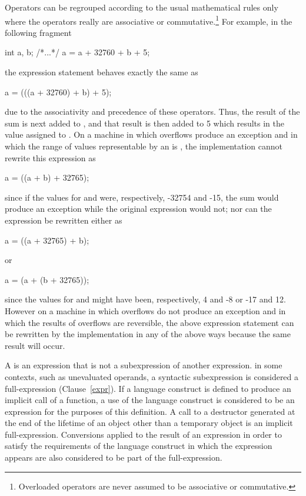 \pnum
{}%
%
\enternote Operators can be regrouped according to the usual
mathematical rules only where the operators really are associative or
commutative.\footnote{Overloaded operators are never assumed to be associative or
commutative. }
For example, in the following fragment
\begin{codeblock}
int a, b;
/*...*/
a = a + 32760 + b + 5;
\end{codeblock}
the expression statement behaves exactly the same as
\begin{codeblock}
a = (((a + 32760) + b) + 5);
\end{codeblock}
due to the associativity and precedence of these operators. Thus, the
result of the sum  is next added to , and
that result is then added to 5 which results in the value assigned to
. On a machine in which overflows produce an exception and in
which the range of values representable by an  is
, the implementation cannot rewrite this
expression as
\begin{codeblock}
a = ((a + b) + 32765);
\end{codeblock}
since if the values for  and  were, respectively,
-32754 and -15, the sum  would produce an exception while
the original expression would not; nor can the expression be rewritten
either as
\begin{codeblock}
a = ((a + 32765) + b);
\end{codeblock}
or
\begin{codeblock}
a = (a + (b + 32765));
\end{codeblock}
since the values for  and  might have been,
respectively, 4 and -8 or -17 and 12. However on a machine in which
overflows do not produce an exception and in which the results of
overflows are reversible, the above expression statement can be
rewritten by the implementation in any of the above ways because the
same result will occur. \exitnote

\pnum
{}%
A  is an expression that is not a
subexpression of another expression.
\enternote
in some contexts, such as unevaluated operands, a syntactic
subexpression is considered a full-expression
(Clause~\ref{expr}).
\exitnote
If a language construct is defined
to produce an implicit call of a function, a use of the language
construct is considered to be an expression for the purposes of this
definition. A call to a destructor generated at the end of the lifetime
of an object other than a temporary object is an implicit
full-expression. Conversions applied to the result of an expression in
order to satisfy the requirements of the language construct in which the
expression appears are also considered to be part of the
full-expression.

